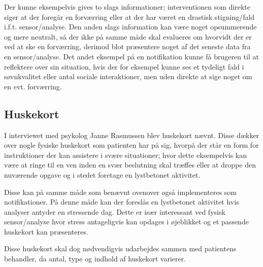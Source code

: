 Der kunne eksempelvis gives to slags informationer; interventionen som direkte siger at der foregår en forværring eller at der har været en drastisk stigning/fald i.f.t. sensor/analyse.
Den anden slags information kan være noget opsummerende og mere neutralt, så der ikke på samme måde skal evalueres om hvorvidt der er ved at ske en forværring, derimod blot præsentere noget af det seneste data fra en sensor/analyse.
Det andet eksempel på en notifikation kunne få brugeren til at reflektere over sin situation, hvis der for eksempel kunne ses et tydeligt fald i søvnkvalitet eller antal sociale interaktioner, men uden direkte at sige noget om en evt. forværring.

\subsection{Huskekort}
I interviewet med psykolog Janne Rasmussen blev huskekort nævnt.
Disse dækker over nogle fysiske huskekort som patienten har på sig, hvorpå der står en form for instruktioner der kan assistere i svære situationer; hvor dette eksempelvis kan være at ringe til en ven inden en svær beslutning skal træffes eller at droppe den nuværende opgave og i stedet foretage en lystbetonet aktivitet.

Disse kan på samme måde som benævnt ovenover også implementeres som notifikationer.
På denne måde kan der foreslås en lystbetonet aktivitet hvis analyser antyder en stressende dag.
Dette er især interessant ved fysisk sensor/analyse hvor stress antageligvis kan opdages i øjeblikket og et passende huskekort kan præsenteres.

Disse huskekort skal dog nødvendigvis udarbejdes sammen med patientens behandler, da antal, type og indhold af huskekort varierer.
